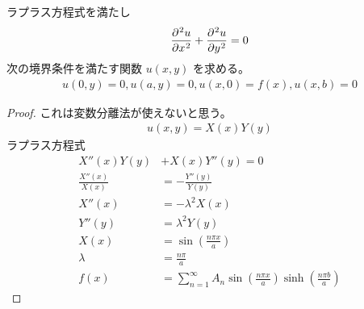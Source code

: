 \documentclass[uplatex,diffipdfmx,a4paper,11pt]{jlreq}
\begin{document}
\begin{proposition}
  ラプラス方程式を満たし
  \begin{align}
    \diffp[2]{u}{x} + \diffp[2]{u}{y} = 0
  \end{align}
  次の境界条件を満たす関数 $u(x, y)$ を求める。
  \begin{align}
    u(0, y) = 0, u(a, y) = 0, u(x, 0) = f(x), u(x, b) = 0
  \end{align}
\end{proposition}
\begin{proof}
  これは変数分離法が使えないと思う。
  \begin{align}
    u(x, y) = X(x)Y(y)
  \end{align}
  ラプラス方程式
  \begin{align}
    X''(x)Y(y)          & + X(x)Y''(y) = 0                                                      \\
    \frac{X''(x)}{X(x)} & = - \frac{Y''(y)}{Y(y)}                                               \\
    X''(x)              & = - \lambda^2X(x)                                                     \\
    Y''(y)              & = \lambda^2Y(y)                                                       \\
    X(x)                & = \sin(\frac{n\pi x}{a})                                              \\
    \lambda             & = \frac{n\pi}{a}                                                      \\
    f(x)                & = \sum_{n=1}^{\infty}A_n\sin(\frac{n\pi x}{a})\sinh(\frac{n\pi b}{a})
  \end{align}
\end{proof}
\end{document}
